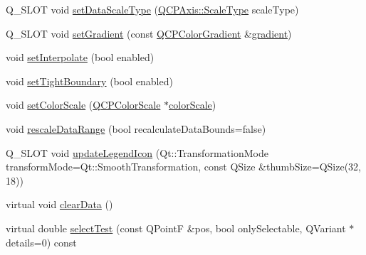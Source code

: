 \begin{DoxyCompactItemize}
\item 
Q\+\_\+\+S\+L\+O\+T void \hyperlink{class_q_c_p_color_map_a9d20aa08e3c1f20f22908c45b9c06511}{set\+Data\+Scale\+Type} (\hyperlink{class_q_c_p_axis_a36d8e8658dbaa179bf2aeb973db2d6f0}{Q\+C\+P\+Axis\+::\+Scale\+Type} scale\+Type)
\item 
Q\+\_\+\+S\+L\+O\+T void \hyperlink{class_q_c_p_color_map_a7313c78360471cead3576341a2c50377}{set\+Gradient} (const \hyperlink{class_q_c_p_color_gradient}{Q\+C\+P\+Color\+Gradient} \&\hyperlink{class_q_c_p_color_map_a9f967a971474e32345290b79cf107809}{gradient})
\item 
void \hyperlink{class_q_c_p_color_map_a484eaa8a5065cfc386b15375bf98b964}{set\+Interpolate} (bool enabled)
\item 
void \hyperlink{class_q_c_p_color_map_ad03221cc285e5f562a0b13d684b5576d}{set\+Tight\+Boundary} (bool enabled)
\item 
void \hyperlink{class_q_c_p_color_map_aa828921db364fe3c6af4619580ab85fd}{set\+Color\+Scale} (\hyperlink{class_q_c_p_color_scale}{Q\+C\+P\+Color\+Scale} $\ast$\hyperlink{class_q_c_p_color_map_a6bd82e0b042a2ec4d64f40853a3b05e3}{color\+Scale})
\item 
void \hyperlink{class_q_c_p_color_map_a856608fa3dd1cc290bcd5f29a5575774}{rescale\+Data\+Range} (bool recalculate\+Data\+Bounds=false)
\item 
Q\+\_\+\+S\+L\+O\+T void \hyperlink{class_q_c_p_color_map_a5d8158b62d55fcfeaabcb68ce0083e87}{update\+Legend\+Icon} (Qt\+::\+Transformation\+Mode transform\+Mode=Qt\+::\+Smooth\+Transformation, const Q\+Size \&thumb\+Size=Q\+Size(32, 18))
\item 
virtual void \hyperlink{class_q_c_p_color_map_a0545dce5383766885912331705a8e099}{clear\+Data} ()
\item 
virtual double \hyperlink{class_q_c_p_color_map_a4088dc7bcbe9bba605c84a912ba660ff}{select\+Test} (const Q\+Point\+F \&pos, bool only\+Selectable, Q\+Variant $\ast$details=0) const 
\end{DoxyCompactItemize}
